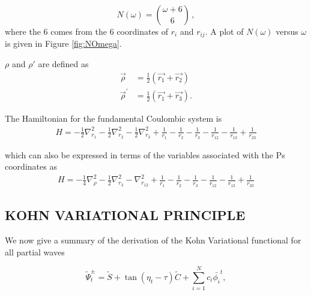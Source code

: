 \documentclass[preprint,showpacs,preprintnumbers,amsmath,amssymb]{revtex4}
\newcommand{\beq}{\begin{equation}}
\newcommand{\eeq}{\end{equation}}
\begin{document}
\beq
\label{eq:NumberTermsOmega}
N(\omega) = \binom{\omega+6}{6} \, ,
\eeq
\noindent where the 6 comes from the 6 coordinates of $r_i$ and $r_{ij}$.  A plot of $N(\omega)$ versus $\omega$ is given in Figure \ref{fig:NOmega}.

$\rho$ and $\rho'$ are defined as
\begin{subequations}
\begin{align}
\vec{\rho} &= \frac{1}{2}\left(\vec{r_1} + \vec{r_2}\right) \label{eq:RhoDef}\\
\vec{\rho}^\prime &= \frac{1}{2}\left(\vec{r_1} + \vec{r_3}\right) \label{eq:RhopDef}.
\end{align}
\end{subequations}



The Hamiltonian for the fundamental Coulombic system is
\begin{align}
H = -\frac{1}{2} \nabla_{r_1}^2 - \frac{1}{2} \nabla_{r_2}^2 - \frac{1}{2} \nabla_{r_3}^2 + \frac {1}{r_1}-\frac {1}{r_2}-\frac {1}{r_3}-\frac {1}{r_{12}}-\frac {1}{r_{13}}+\frac {1}{r_{23}}	\label{Hamiltonian1}
\end{align}

\noindent which  can also be expressed in terms of the  variables associated with the Ps coordinates as
\begin{align}
H = -\frac{1}{4} \nabla_{\rho}^2 - \frac{1}{2} \nabla_{r_3}^2 - \nabla_{r_{12}}^2 + \frac {1}{r_1}-\frac {1}{r_2}-\frac {1}{r_3}-\frac {1}{r_{12}}-\frac {1}{r_{13}}+\frac {1}{r_{23}}
	\label{Hamiltonian2}
\end{align}
\subsection{ KOHN VARIATIONAL PRINCIPLE}

We now give a summary of the  derivation of  the  Kohn Variational functional for all partial waves 



\begin{equation}
\tilde{\Psi}_t^\pm = \tilde{S} + {\tan(\eta_t-\tau)}  \tilde{C} + \sum_{i=1}^N c_i \bar{\phi_i}^t ,
\label{eq:TrialSimpleGeneral}
\end{equation}
\end{document}
